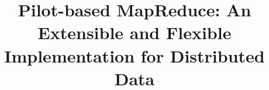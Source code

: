 \documentclass{acm_proc_article-sp}
\begin{document}
\title{Pilot-based MapReduce: An Extensible and Flexible
  Implementation for Distributed Data}

%
%
%
%
%
\end{document}
